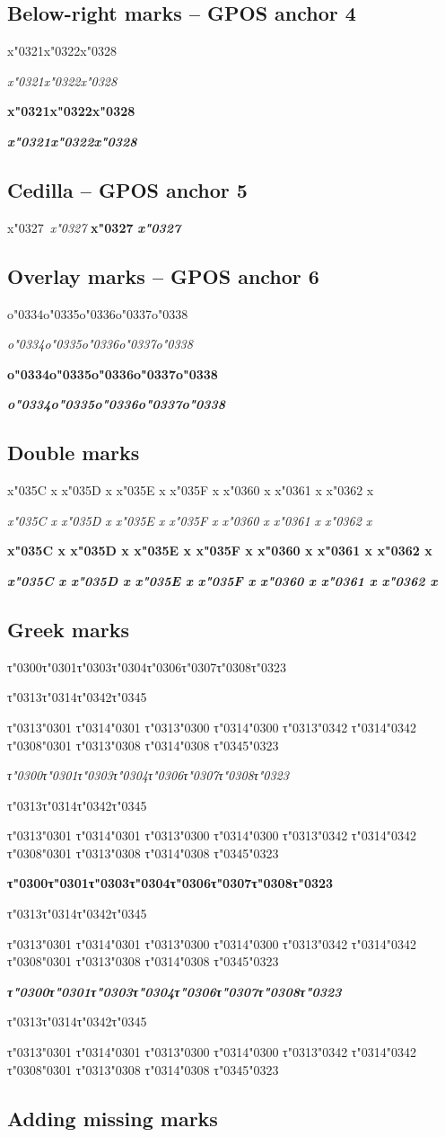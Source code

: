 \documentclass[landscape]{article}
\newcommand{\gs}{\hspace{0.5mm}}	%
\newcommand{\ribbi}[1]{#1\
	
	{\itshape #1}
	
	{\bfseries #1}
	
	{\itshape\bfseries #1}}
\newcommand{\ribbiline}[1]{#1\ 
	{\itshape #1}
	{\bfseries #1}
	{\itshape\bfseries #1}}
\begin{document}
\subsection*{Below-right marks -- GPOS anchor 4}

\ribbi{
	x\char"0321\gs x\char"0322\gs x\char"0328\gs
}

\subsection*{Cedilla -- GPOS anchor 5}

\ribbiline{x\char"0327\gs}

\subsection*{Overlay marks -- GPOS anchor 6}

\ribbi{
	o\char"0334\gs o\char"0335\gs o\char"0336\gs o\char"0337\gs o\char"0338\gs
}

\subsection*{Double marks}

\ribbi{
	x\char"035C x\gs 
	x\char"035D x\gs 
	x\char"035E x\gs 
	x\char"035F x\gs 
	x\char"0360 x\gs 
	x\char"0361 x\gs 
	x\char"0362 x\gs
}

\subsection*{Greek marks}

\ribbi{
	τ\char"0300\gs τ\char"0301\gs τ\char"0303\gs τ\char"0304\gs τ\char"0306\gs τ\char"0307\gs τ\char"0308\gs τ\char"0323\gs 

	τ\char"0313\gs τ\char"0314\gs τ\char"0342\gs τ\char"0345\gs

	τ\char"0313\char"0301\gs 
	τ\char"0314\char"0301\gs 
	τ\char"0313\char"0300\gs 
	τ\char"0314\char"0300\gs
	τ\char"0313\char"0342\gs 
	τ\char"0314\char"0342\gs 
	τ\char"0308\char"0301\gs 
	τ\char"0313\char"0308\gs
	τ\char"0314\char"0308\gs 
	τ\char"0345\char"0323\gs 
}

\newpage
\subsection*{Adding missing marks}
\end{document}

